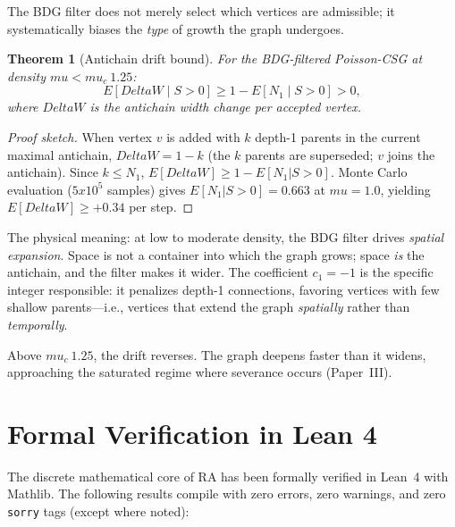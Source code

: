 \documentclass[11pt]{article}
\def\Delta{Delta}%
\def\mu{mu}%
\def\mathbb#1{#1}%
\def\times{x}%
\def\approx{~}%
\newtheorem{theorem}{Theorem}
\begin{document}
The BDG filter does not merely select which vertices are admissible; it systematically biases the \emph{type} of growth the graph undergoes.

\begin{theorem}[Antichain drift bound]
\label{thm:drift}
For the BDG-filtered Poisson-CSG at density $\mu<\mu_c\approx 1.25$:
\begin{equation}
\mathbb{E}[\Delta W\mid S>0] \ge 1-\mathbb{E}[N_1\mid S>0] > 0,
\end{equation}
where $\Delta W$ is the antichain width change per accepted vertex.
\end{theorem}
\begin{proof}[Proof sketch]
When vertex $v$ is added with $k$ depth-1 parents in the current maximal antichain, $\Delta W=1-k$ (the $k$ parents are superseded; $v$ joins the antichain). Since $k\le N_1$, $\mathbb{E}[\Delta W]\ge 1-\mathbb{E}[N_1|S>0]$. Monte Carlo evaluation ($5\times 10^5$ samples) gives $\mathbb{E}[N_1|S>0]=0.663$ at $\mu=1.0$, yielding $\mathbb{E}[\Delta W]\ge +0.34$ per step.
\end{proof}

The physical meaning: at low to moderate density, the BDG filter drives \emph{spatial expansion}. Space is not a container into which the graph grows; space \emph{is} the antichain, and the filter makes it wider. The coefficient $c_1=-1$ is the specific integer responsible: it penalizes depth-1 connections, favoring vertices with few shallow parents---i.e., vertices that extend the graph \emph{spatially} rather than \emph{temporally}.

Above $\mu_c\approx 1.25$, the drift reverses. The graph deepens faster than it widens, approaching the saturated regime where severance occurs (Paper~III).

\section{Formal Verification in Lean 4}
\label{sec:lean}

The discrete mathematical core of RA has been formally verified in Lean~4 with Mathlib. The following results compile with zero errors, zero warnings, and zero \texttt{sorry} tags (except where noted):
\end{document}
